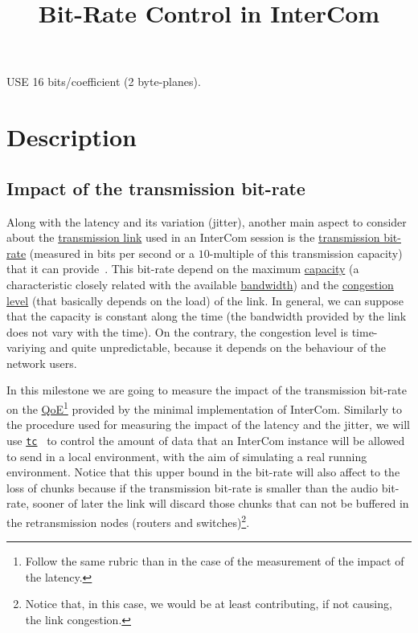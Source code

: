 
\title{Bit-Rate Control in InterCom}

USE 16 bits/coefficient (2 byte-planes).

\maketitle

\section{Description}
\subsection{Impact of the transmission bit-rate}
Along with the latency and its variation (jitter), another main aspect
to consider about the
\href{https://en.wikipedia.org/wiki/Telecommunications_link}{transmission
  link} used in an InterCom session is the
\href{https://en.wikipedia.org/wiki/Bit_rate}{transmission bit-rate}
(measured in bits per second or a $10$-multiple of this transmission
capacity) that it can provide~\cite{Forouzan,Tanenbaum}. This bit-rate
depend on the maximum
\href{https://en.wikipedia.org/wiki/Bandwidth_(computing)}{capacity}
(a characteristic closely related with the available
\href{https://en.wikipedia.org/wiki/Bandwidth_(signal_processing)}{bandwidth})
and the
\href{https://en.wikipedia.org/wiki/Network_congestion}{congestion
  level} (that basically depends on the load) of the link. In general,
we can suppose that the capacity is constant along the time (the
bandwidth provided by the link does not vary with the time). On the
contrary, the congestion level is time-variying and quite
unpredictable, because it depends on the behaviour of the network
users.

In this milestone we are going to measure the impact of the
transmission bit-rate on the
\href{https://en.wikipedia.org/wiki/Quality_of_experience}{QoE}\footnote{Follow
  the same rubric than in the case of the measurement of the impact of
  the latency.} provided by the minimal implementation of InterCom. Similarly to the procedure used for measuring the impact of
the latency and the jitter, we will use
\href{https://man7.org/linux/man-pages/man8/tc.8.html}{\texttt{tc}}~\cite{bert2012lartc}
to control the amount of data that an InterCom instance will be
allowed to send in a local environment, with the aim of simulating a
real running environment. Notice that this upper bound in the bit-rate
will also affect to the loss of chunks because if the transmission
bit-rate is smaller than the audio bit-rate, sooner of later the link
will discard those chunks that can not be buffered in the retransmission
nodes (routers and switches)\footnote{Notice that, in this case, we
would be at least contributing, if not causing, the link congestion.}.

